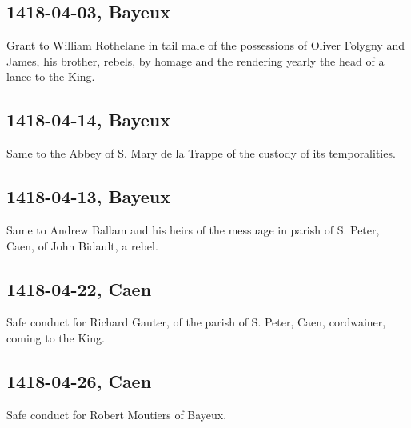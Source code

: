 \documentclass[a4paper,12pt,twoside]{book}
\begin{document}
                
                \subsection{1418-04-03, Bayeux}
                
                
                     Grant to William Rothelane in tail male of the possessions of Oliver Folygny and James, his brother, rebels, by homage and the rendering yearly the head of a lance to the King.
                  
                
                \subsection{1418-04-14, Bayeux}
                
                
                     Same to the Abbey of S. Mary de la Trappe of the custody of its temporalities.
                  
                
                \subsection{1418-04-13, Bayeux}
                
                
                     Same to Andrew Ballam and his heirs of the messuage in parish of S. Peter, Caen, of John Bidault, a rebel.
                  
                
                \subsection{1418-04-22, Caen}
                
                
                     Safe conduct for Richard Gauter, of the parish of S. Peter, Caen, cordwainer, coming to the King.
                  
                
                \subsection{1418-04-26, Caen}
                
                
                     Safe conduct for Robert Moutiers of Bayeux.
                  
                
\end{document}

